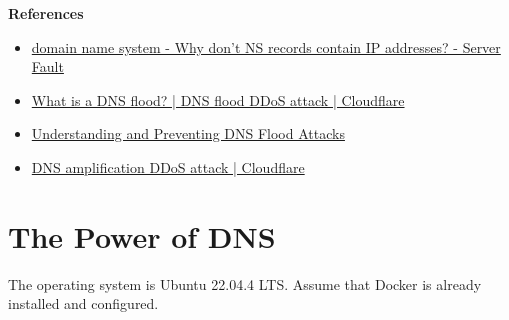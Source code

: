\documentclass[12pt, a4paper]{article}
\begin{document}
  \textbf{References}
  \begin{itemize}
    \item \href{https://serverfault.com/questions/764937/why-dont-ns-records-contain-ip-addresses}{domain name system - Why don't NS records contain IP addresses? - Server Fault}
    \item \href{https://www.cloudflare.com/learning/ddos/dns-flood-ddos-attack/}{What is a DNS flood? | DNS flood DDoS attack | Cloudflare}
    \item \href{https://www.catchpoint.com/dns-monitoring/dns-flood}{Understanding and Preventing DNS Flood Attacks}
    \item \href{https://www.cloudflare.com/learning/ddos/dns-amplification-ddos-attack/}{DNS amplification DDoS attack | Cloudflare}
  \end{itemize}

  \pagebreak
  \section{The Power of DNS}
  The operating system is Ubuntu 22.04.4 LTS. Assume that Docker is already
  installed and configured.
\end{document}
